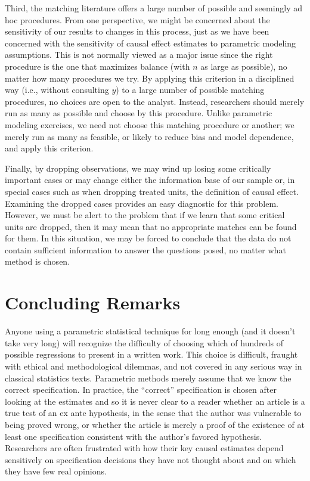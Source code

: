 \documentclass[11pt,titlepage]{article}
\begin{document}
Third, the matching literature offers a large number of possible and
seemingly ad hoc procedures.  From one perspective, we might be
concerned about the sensitivity of our results to changes in this
process, just as we have been concerned with the sensitivity of causal
effect estimates to parametric modeling assumptions.  This is not
normally viewed as a major issue since the right procedure is the one
that maximizes balance (with $n$ as large as possible), no matter how
many procedures we try.  By applying this criterion in a disciplined
way (i.e., without consulting $y$) to a large number of possible
matching procedures, no choices are open to the analyst.  Instead,
researchers should merely run as many as possible and choose by this
procedure.  Unlike parametric modeling exercises, we need not choose
this matching procedure or another; we merely run as many as feasible,
or likely to reduce bias and model dependence, and apply this
criterion.

Finally, by dropping observations, we may wind up losing some
critically important cases or may change either the information base
of our sample or, in special cases such as when dropping treated
units, the definition of causal effect.  Examining the dropped cases
provides an easy diagnostic for this problem.  However, we must be
alert to the problem that if we learn that some critical units are
dropped, then it may mean that no appropriate matches can be found for
them.  In this situation, we may be forced to conclude that the data
do not contain sufficient information to answer the questions posed,
no matter what method is chosen.

\section{Concluding Remarks}

Anyone using a parametric statistical technique for long enough (and
it doesn't take very long) will recognize the difficulty of choosing
which of hundreds of possible regressions to present in a written
work.  This choice is difficult, fraught with ethical and
methodological dilemmas, and not covered in any serious way in
classical statistics texts.  Parametric methods merely assume that we
know the correct specification.  In practice, the ``correct''
specification is chosen after looking at the estimates and so it is
never clear to a reader whether an article is a true test of an ex
ante hypothesis, in the sense that the author was vulnerable to being
proved wrong, or whether the article is merely a proof of the
existence of at least one specification consistent with the author's
favored hypothesis.  Researchers are often frustrated with how their
key causal estimates depend sensitively on specification decisions
they have not thought about and on which they have few real opinions.
\end{document}
